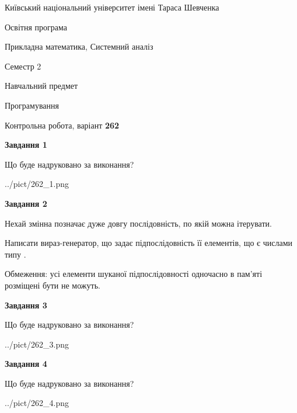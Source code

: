 \documentclass[12pt, ukrainian]{article}
\begin{document}
{{\begin {small}\par
{ \center  Київський національний університет імені Тараса Шевченка \par}
{\parbox {5 cm}{Освітня програма \hfill}{\parbox {8 cm}{Прикладна математика, Системний аналіз \hfill}}\parbox {5 cm}{\hfill Семестр 2}}\par
{\parbox {5 cm} {Навчальний предмет \hfill}\parbox {7 cm}{Програмування \hfill}\parbox {6cm}{\hfill}\par}\vspace{-7pt} \end{small}}{\center Контрольна робота, варіант  \No \textbf
{ 262 }\par}}
{
\begin {large}
{\begin {center}\textbf{Завдання 1}\end {center}}\par
Що буде надруковано за виконання?\par\par
\begin{center}
	{../pict/262_1.png}
\end{center}
\newpage

{\begin {center}\textbf{Завдання 2}\end {center}}\par
Нехай змінна  позначає дуже довгу послідовність, по якій можна ітерувати.

Написати вираз-генератор, що задає підпослідовність її елементів, що є числами типу .

Обмеження: усі елементи шуканої підпослідовності одночасно в пам'яті розміщені бути не можуть.\par
\newpage

{\begin {center}\textbf{Завдання 3}\end {center}}\par
Що буде надруковано за виконання?
\begin{center}
	{../pict/262_3.png}
\end{center}
\newpage

{\begin {center}\textbf{Завдання 4}\end {center}}\par
Що буде надруковано за виконання?\par
\begin{center}
	{../pict/262_4.png}
\end{center}
\newpage


\end{large}}
\end{document}
